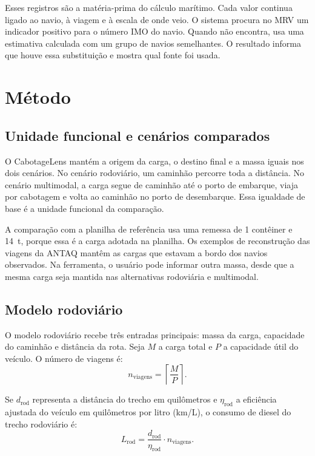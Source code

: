 \documentclass[12pt,a4paper]{report}
\begin{document}
Esses registros são a matéria-prima do cálculo marítimo. Cada valor continua ligado ao navio, à viagem e à escala de onde veio. O sistema procura no MRV um indicador positivo para o número IMO do navio. Quando não encontra, usa uma estimativa calculada com um grupo de navios semelhantes. O resultado informa que houve essa substituição e mostra qual fonte foi usada.

\chapter{Método}
\label{chap:metodo}

\section{Unidade funcional e cenários comparados}

O CabotageLens mantém a origem da carga, o destino final e a massa iguais nos dois cenários. No cenário rodoviário, um caminhão percorre toda a distância. No cenário multimodal, a carga segue de caminhão até o porto de embarque, viaja por cabotagem e volta ao caminhão no porto de desembarque. Essa igualdade de base é a unidade funcional da comparação.

A comparação com a planilha de referência usa uma remessa de \num{1} contêiner e \num{14}~t, porque essa é a carga adotada na planilha. Os exemplos de reconstrução das viagens da ANTAQ mantêm as cargas que estavam a bordo dos navios observados. Na ferramenta, o usuário pode informar outra massa, desde que a mesma carga seja mantida nas alternativas rodoviária e multimodal.

\section{Modelo rodoviário}

O modelo rodoviário recebe três entradas principais: massa da carga, capacidade do caminhão e distância da rota. Seja \(M\) a carga total e \(P\) a capacidade útil do veículo. O número de viagens é:
\begin{equation}
n_{\text{viagens}} = \left\lceil \frac{M}{P} \right\rceil.
\label{eq:road-trips}
\end{equation}

Se \(d_{\text{rod}}\) representa a distância do trecho em quilômetros e \(\eta_{\text{rod}}\) a eficiência ajustada do veículo em quilômetros por litro (km/L), o consumo de diesel do trecho rodoviário é:
\begin{equation}
L_{\text{rod}} = \frac{d_{\text{rod}}}{\eta_{\text{rod}}} \cdot n_{\text{viagens}}.
\label{eq:road-fuel}
\end{equation}
\end{document}

